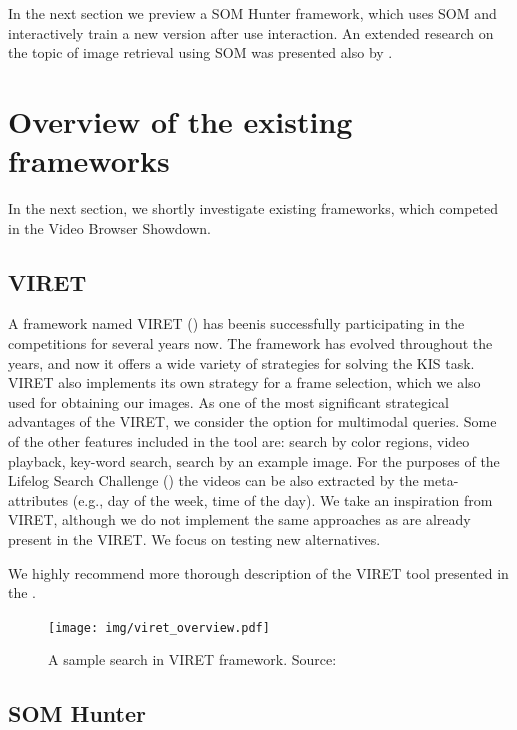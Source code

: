In the next section we preview a SOM Hunter framework, which uses SOM and interactively train a new version after use interaction. An extended research on the topic of image retrieval using SOM was presented also by \cite{koskela2003interactive}.

\section{Overview of the existing frameworks}

In the next section, we shortly investigate existing frameworks, which competed in the Video Browser Showdown.

\subsection{VIRET}

A framework named VIRET (\cite{lokovc2019framework, lokovc2019viret}) has beenis successfully participating in the competitions for several years now. The framework has evolved throughout the years, and now it offers a wide variety of strategies for solving the KIS task. VIRET also implements its own strategy for a frame selection, which we also used for obtaining our images. As one of the most significant strategical advantages of the VIRET, we consider the option for multimodal queries. Some of the other features included in the tool are: search by color regions, video playback, key-word search, search by an example image. For the purposes of the Lifelog Search Challenge (\cite{LSC20}) the videos can be also extracted by the meta-attributes (e.g., day of the week, time of the day). We take an inspiration from VIRET, although we do not implement the same approaches as are already present in the VIRET. We focus on testing new alternatives.

We highly recommend more thorough description of the VIRET tool presented in the \cite{kovalvcik2020viret}.

\begin{figure}
    \centering
    \texttt{[image: img/viret\_overview.pdf]}
    \caption{A sample search in VIRET framework. Source: \cite{kovalvcik2020viret}}
    \label{fig:viret}
\end{figure}

\subsection{SOM Hunter}

